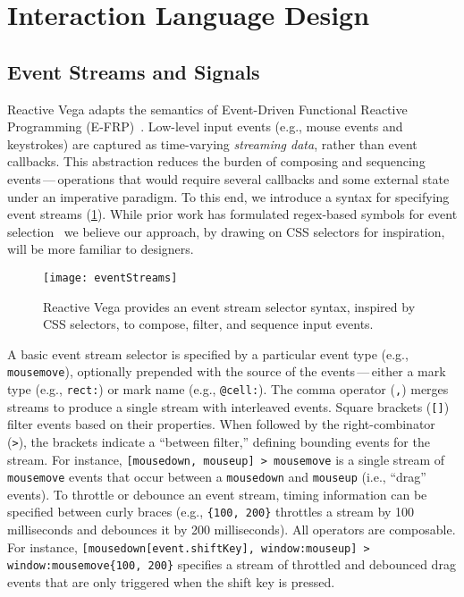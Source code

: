 \section{Interaction Language Design}
\label{sec:vg:primitives}
\subsection{Event Streams and Signals}

Reactive Vega adapts the semantics of Event-Driven Functional Reactive
Programming (E-FRP)~\cite{wan:efrp}. Low-level input events (e.g., mouse events
and keystrokes) are captured as time-varying \emph{streaming data}, rather than
event callbacks. This abstraction reduces the burden of composing and sequencing
events\,---\,operations that would require several callbacks and some external
state under an imperative paradigm. To this end, we introduce a syntax for
specifying event streams (\cref{fig:vg:eventStreams}). While prior work has
formulated regex-based symbols for event selection~\cite{kin:proton++} we
believe our approach, by drawing on CSS selectors for inspiration, will be more
familiar to designers.

\begin{figure}[h!]
  \centering
  \texttt{[image: eventStreams]}
  \caption{Reactive Vega provides an event stream selector syntax, inspired by
  CSS selectors, to compose, filter, and sequence input events.}
  \label{fig:vg:eventStreams}
\end{figure}

A basic event stream selector is specified by a particular event type (e.g.,
\texttt{mousemove}), optionally prepended with the source of the
events\,---\,either a mark type (e.g., \texttt{rect:}) or mark name (e.g.,
\texttt{@cell:}). The comma operator (\texttt{,}) merges streams to produce a
single stream with interleaved events. Square brackets (\texttt{[]}) filter
events based on their properties. When followed by the right-combinator
(\texttt{>}), the brackets indicate a ``between filter,'' defining bounding
events for the stream. For instance, \texttt{[mousedown, mouseup] > mousemove}
is a single stream of \texttt{mousemove} events that occur between a
\texttt{mousedown} and \texttt{mouseup} (i.e., ``drag'' events). To throttle or
debounce an event stream, timing information can be specified between curly
braces (e.g., \texttt{\{100, 200\}} throttles a stream by 100 milliseconds and
debounces it by 200 milliseconds).  All operators are composable. For instance,
\texttt{[mousedown[event.shiftKey], window:mouseup] > window:mousemove\{100,
200\}} specifies a stream of throttled and debounced drag events that are only
triggered when the shift key is pressed.

